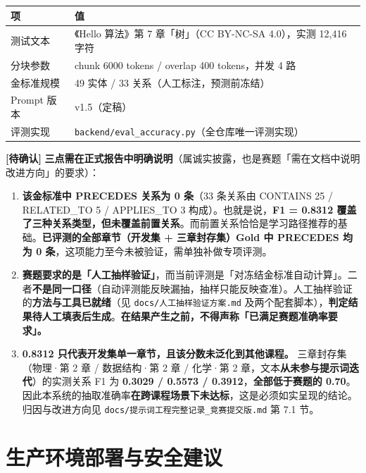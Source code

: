 \documentclass[UTF8,a4paper,11pt]{ctexrep}
\newcommand{\verifymark}{\textcolor{todobar}{\textbf{[待确认]}}}
\begin{document}
\begin{center}
\small
\begin{tabularx}{\linewidth}{@{}XX@{}}
\toprule
项 & 值 \\
\midrule
测试文本 & 《Hello 算法》第 7 章「树」（CC BY-NC-SA 4.0），实测 12,416 字符 \\
分块参数 & chunk 6000 tokens / overlap 400 tokens，并发 4 路 \\
金标准规模 & 49 实体 / 33 关系（人工标注，预测前冻结） \\
Prompt 版本 & v1.5（定稿） \\
评测实现 & \texttt{backend/eval\_accuracy.py}（全仓库唯一评测实现） \\
\bottomrule
\end{tabularx}
\end{center}
\begin{todobox}
\verifymark{} \textbf{三点需在正式报告中明确说明}（属诚实披露，也是赛题「需在文档中说明改进方向」的要求）：

\begin{enumerate}
\item \textbf{该金标准中 PRECEDES 关系为 0 条}（33 条关系由 CONTAINS 25 / RELATED\_TO 5 / APPLIES\_TO 3 构成）。也就是说，\textbf{F1 = 0.8312 覆盖了三种关系类型，但未覆盖前置关系}。而前置关系恰恰是学习路径推荐的基础。\textbf{已评测的全部章节（开发集 + 三章封存集）Gold 中 PRECEDES 均为 0 条}，这项能力至今未被验证，需单独补做专项评测。
\item \textbf{赛题要求的是「人工抽样验证」}，而当前评测是「对冻结金标准自动计算」。二者\textbf{不是同一口径}（自动评测能反映漏抽，抽样只能反映查准）。人工抽样验证的\textbf{方法与工具已就绪}（见 \texttt{docs/人工抽样验证方案.md} 及两个配套脚本），\textbf{判定结果待人工填表后生成}。\textbf{在结果产生之前，不得声称「已满足赛题准确率要求」。}
\item \textbf{0.8312 只代表开发集单一章节，且该分数未泛化到其他课程。} 三章封存集（物理·第 2 章 / 数据结构·第 2 章 / 化学·第 2 章，文本\textbf{从未参与提示词迭代}）的实测关系 F1 为 \textbf{0.3029 / 0.5573 / 0.3912}，\textbf{全部低于赛题的 0.70}。因此本系统的抽取准确率\textbf{在跨课程场景下未达标}，这是必须如实呈现的结论。归因与改进方向见 \texttt{docs/提示词工程完整记录\_竞赛提交版.md} 第 7.1 节。
\end{enumerate}
\end{todobox}


\section{生产环境部署与安全建议}
\end{document}
